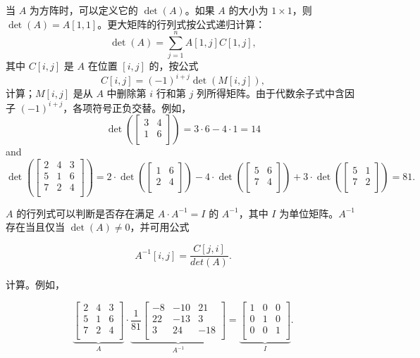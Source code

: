 
当 $A$ 为方阵时，可以定义它的 $\det(A)$。如果 $A$ 的大小为 $1 \times 1$，则 $\det(A)=A[1,1]$。更大矩阵的行列式按公式递归计算：
\[\det(A)=\sum_{j=1}^n A[1,j] C[1,j],\]
其中 $C[i,j]$ 是 $A$ 在位置 $[i,j]$ 的，按公式
\[C[i,j] = (-1)^{i+j} \det(M[i,j]),\]
计算；$M[i,j]$ 是从 $A$ 中删除第 $i$ 行和第 $j$ 列所得矩阵。由于代数余子式中含因子 $(-1)^{i+j}$，各项符号正负交替。例如，
\[
\det(
 \begin{bmatrix}
  3 & 4 \\
  1 & 6 \\
 \end{bmatrix}
) = 3 \cdot 6 - 4 \cdot 1 = 14 
\]
and
\[
\det(
 \begin{bmatrix}
  2 & 4 & 3 \\
  5 & 1 & 6 \\
  7 & 2 & 4 \\
 \end{bmatrix}
) = 
2 \cdot
\det(
 \begin{bmatrix}
  1 & 6 \\
  2 & 4 \\
 \end{bmatrix}
)
-4 \cdot
\det(
 \begin{bmatrix}
  5 & 6 \\
  7 & 4 \\
 \end{bmatrix}
)
+3 \cdot
\det(
 \begin{bmatrix}
  5 & 1 \\
  7 & 2 \\
 \end{bmatrix}
) = 81.
\]


$A$ 的行列式可以判断是否存在满足 $A \cdot A^{-1}=I$ 的 $A^{-1}$，其中 $I$ 为单位矩阵。$A^{-1}$ 存在当且仅当 $\det(A) \neq 0$，并可用公式

\[A^{-1}[i,j] = \frac{C[j,i]}{det(A)}.\]

计算。例如，

\[
\underbrace{
 \begin{bmatrix}
  2 & 4 & 3\\
  5 & 1 & 6\\
  7 & 2 & 4\\
 \end{bmatrix}
}_{A}
\cdot
\underbrace{
 \frac{1}{81}
 \begin{bmatrix}
   -8 & -10 & 21 \\
   22 & -13 & 3 \\
   3 & 24 & -18 \\
 \end{bmatrix}
}_{A^{-1}}
=
\underbrace{
 \begin{bmatrix}
  1 & 0 & 0 \\
  0 & 1 & 0 \\
  0 & 0 & 1 \\
 \end{bmatrix}
}_{I}.
\]

